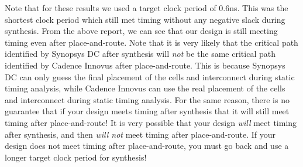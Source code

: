 \documentclass[a4paper,12pt,twoside]{article}
\begin{document}
Note that for these results we used a target clock period of 0.6ns. This was the shortest clock period which still met timing without any negative slack during synthesis. From the above report, we can see that our design is still meeting timing even after place-and-route. Note that it is very likely that the critical path identified by Synopsys DC after synthesis will \textit{not} be the same critical path identified by Cadence Innovus after place-and-route. This is because Synopsys DC can only guess the final placement of the cells and interconnect during static timing analysis, while Cadence Innovus can use the real placement of the cells and interconnect during static timing analysis. For the same reason, there is no guarantee that if your design meets timing after synthesis that it will still meet timing after place-and-route! It is very possible that your design \textit{will} meet timing after synthesis, and then \textit{will not} meet timing after place-and-route. If your design does not meet timing after place-and-route, you must go back and use a longer target clock period for synthesis!
\end{document}
